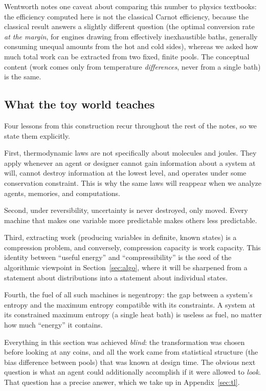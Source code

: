 \documentclass[10pt]{article}
\theoremstyle{definition}
\theoremstyle{remark}
\begin{document}
Wentworth notes one caveat about comparing this number to physics textbooks: the efficiency computed here is not the classical Carnot efficiency, because the classical result answers a slightly different question (the optimal conversion rate \emph{at the margin}, for engines drawing from effectively inexhaustible baths, generally consuming unequal amounts from the hot and cold sides), whereas we asked how much total work can be extracted from two fixed, finite pools. The conceptual content (work comes only from temperature \emph{differences}, never from a single bath) is the same.

\subsection{What the toy world teaches}
\label{sec:cointeach}

Four lessons from this construction recur throughout the rest of the notes, so we state them explicitly.

First, thermodynamic laws are not specifically about molecules and joules. They apply whenever an agent or designer cannot gain information about a system at will, cannot destroy information at the lowest level, and operates under some conservation constraint. This is why the same laws will reappear when we analyze agents, memories, and computations.

Second, under reversibility, uncertainty is never destroyed, only moved. Every machine that makes one variable more predictable makes others less predictable.

Third, extracting work (producing variables in definite, known states) is a compression problem, and conversely, compression capacity is work capacity. This identity between ``useful energy'' and ``compressibility'' is the seed of the algorithmic viewpoint in Section~\ref{sec:algo}, where it will be sharpened from a statement about distributions into a statement about individual states.

Fourth, the fuel of all such machines is negentropy: the gap between a system's entropy and the maximum entropy compatible with its constraints. A system at its constrained maximum entropy (a single heat bath) is useless as fuel, no matter how much ``energy'' it contains.

Everything in this section was achieved \emph{blind}: the transformation was chosen before looking at any coins, and all the work came from statistical structure (the bias difference between pools) that was known at design time. The obvious next question is what an agent could additionally accomplish if it were allowed to \emph{look}. That question has a precise answer, which we take up in Appendix~\ref{sec:tl}.
\end{document}

